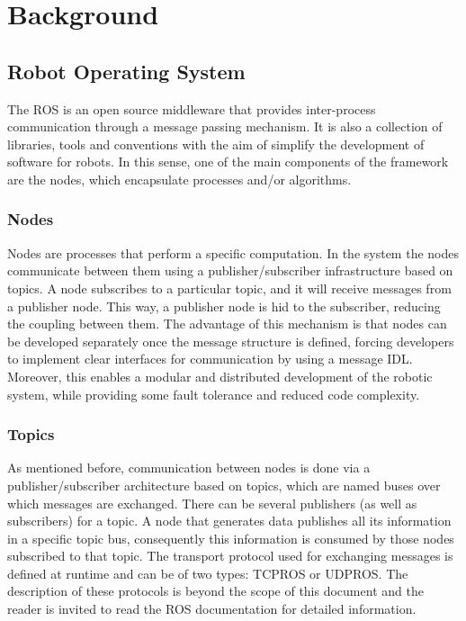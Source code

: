 \cleardoublepage
\chapter{Background}
\label{ch:chapter1}

\section{Robot Operating System}
\label{sec:chapter1:ros}
The \ac{ROS} \cite{ros-website} is an open source middleware that provides inter-process communication through a message passing mechanism. It is also a collection of libraries, tools and conventions with the aim of simplify the development of software for robots. In this sense, one of the main components of the framework are the nodes, which encapsulate processes and/or algorithms.

\subsection{Nodes}
\label{subsec:chapter1:ros:nodes}
Nodes are processes that perform a specific computation. In the system the nodes communicate between them using a publisher/subscriber infrastructure based on topics. A node subscribes to a particular topic, and it will receive messages from a publisher node. This way, a publisher node is hid to the subscriber, reducing the coupling between them. The advantage of this mechanism is that nodes can be developed separately once the message structure is defined, forcing developers to implement clear interfaces for communication by using a message \ac{IDL}. Moreover, this enables a modular and distributed development of the robotic system, while providing some fault tolerance and reduced code complexity.

\subsection{Topics}
\label{subsec:chapter1:ros:topics}
As mentioned before, communication between nodes is done via a publisher/subscriber architecture based on topics, which are named buses over which messages are exchanged. There can be several publishers (as well as subscribers) for a topic. A node that generates data publishes all its information in a specific topic bus, consequently this information is consumed by those nodes subscribed to that topic. The transport protocol used for exchanging messages is defined at runtime and can be of two types: TCPROS or UDPROS. The description of these protocols is beyond the scope of this document and the reader is invited to read the ROS documentation for detailed information.

